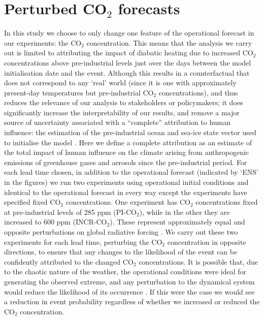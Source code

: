 \section{Perturbed CO$_2$ forecasts}\label{ch3:experiments}

  In this study we choose to only change one feature of the operational forecast in our experiments: the CO$_2$ concentration. This means that the analysis we carry out is limited to attributing the impact of diabatic heating due to increased CO$_2$ concentrations above pre-industrial levels just over the days between the model initialisation date and the event. Although this results in a counterfactual that does not correspond to any `real' world (since it is one with approximately present-day temperatures but pre-industrial CO$_2$ concentrations), and thus reduces the relevance of our analysis to stakeholders or policymakers; it does significantly increase the interpretability of our results, and remove a major source of uncertainty associated with a “complete” attribution to human influence: the estimation of the pre-industrial ocean and sea-ice state vector used to initialise the model \citep{stone_benchmark_2021}. Here we define a complete attribution as an estimate of the total impact of human influence on the climate arising from anthropogenic emissions of greenhouse gases and aerosols since the pre-industrial period. For each lead time chosen, in addition to the operational forecast (indicated by `ENS' in the figures) we run two experiments using operational initial conditions and identical to the operational forecast in every way except the experiments have specified fixed CO$_2$ concentrations. One experiment has CO$_2$ concentrations fixed at pre-industrial levels of 285 ppm (PI-CO$_2$), while in the other they are increased to 600 ppm (INCR-CO$_2$). These represent approximately equal and opposite perturbations on global radiative forcing \citep{etminan_radiative_2016}. We carry out these two experiments for each lead time, perturbing the CO$_2$ concentration in opposite directions, to ensure that any changes to the likelihood of the event can be confidently attributed to the changed CO$_2$ concentrations. It is possible that, due to the chaotic nature of the weather, the operational conditions were ideal for generating the observed extreme, and any perturbation to the dynamical system would reduce the likelihood of its occurrence \citep{shepherd_common_2016}. If this were the case we would see a reduction in event probability regardless of whether we increased or reduced the CO$_2$ concentration.
  

